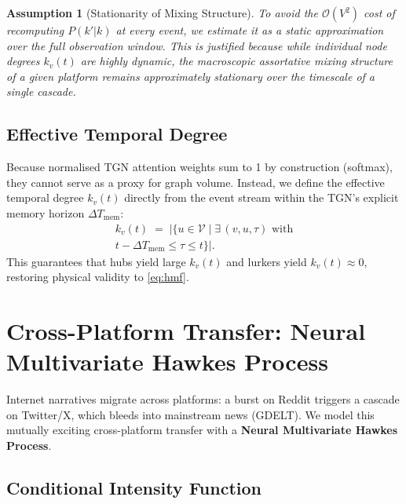 \documentclass[11pt]{article}
\newtheorem{assumption}{Assumption}
\newcommand{\cV}{\mathcal{V}}
\begin{document}
\begin{assumption}[Stationarity of Mixing Structure]
To avoid the $\mathcal{O}(V^2)$ cost of recomputing $P(k'|k)$ at every event,
we estimate it as a static approximation over the full observation window. This
is justified because while individual node degrees $k_v(t)$ are highly dynamic,
the macroscopic assortative mixing structure of a given platform remains
approximately stationary over the timescale of a single cascade.
\end{assumption}

\subsection{Effective Temporal Degree}
\label{sec:temporal-degree}

Because normalised TGN attention weights sum to 1 by construction (softmax),
they cannot serve as a proxy for graph volume. Instead, we define the effective
temporal degree $k_v(t)$ directly from the event stream within the TGN's
explicit memory horizon $\Delta T_{\mathrm{mem}}$:
\begin{multline}
  k_v(t)
  \;=\;
  \bigl|\bigl\{
    u\in\cV
    \;\big|\;
    \exists\,(v,u,\tau) \text{ with} \\
    t - \Delta T_{\mathrm{mem}} \le \tau \le t
  \bigr\}\bigr|.
  \label{eq:temporal-degree}
\end{multline}
This guarantees that hubs yield large $k_v(t)$ and lurkers yield
$k_v(t)\approx 0$, restoring physical validity to \cref{eq:hmf}.

\section{Cross-Platform Transfer: Neural Multivariate Hawkes Process}
\label{sec:hawkes}

Internet narratives migrate across platforms: a burst on Reddit triggers a
cascade on Twitter/X, which bleeds into mainstream news (GDELT). We model this
mutually exciting cross-platform transfer with a \textbf{Neural Multivariate
Hawkes Process}.

\subsection{Conditional Intensity Function}
\end{document}
